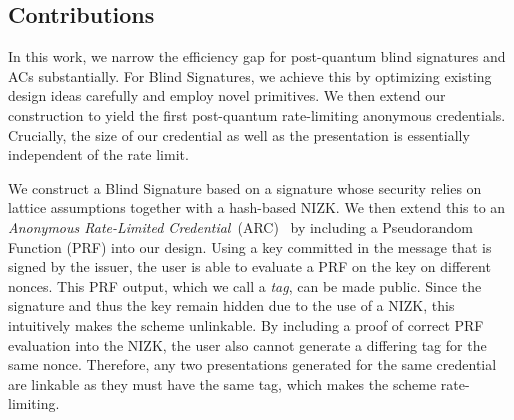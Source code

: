\subsection{Contributions}
In this work, we narrow the efficiency gap for post-quantum blind signatures and ACs substantially. For Blind Signatures, we achieve this by optimizing existing design ideas carefully and employ novel primitives. We then extend our construction to yield the first post-quantum rate-limiting anonymous credentials. Crucially, the size of our credential as well as the presentation is essentially independent of the rate limit.

We construct a Blind Signature based on a signature whose security relies on lattice assumptions together with a  hash-based NIZK. We then extend this to an \emph{Anonymous Rate-Limited Credential}~(ARC)~\cite{yun-privacypass-crypto-arc-00} by including a Pseudorandom Function (PRF) into our design. Using a key committed in the message that is signed by the issuer, the user is able to evaluate a PRF on the key on different nonces. This PRF output, which we call a \emph{tag}, can be made public. Since the signature and thus the key remain hidden due to the use of a NIZK,  this intuitively makes the scheme unlinkable. By including a proof of correct PRF evaluation into the NIZK, the user also cannot generate a differing tag for the same nonce. Therefore, any two presentations generated for the same credential are linkable as they must have the same tag, which makes the scheme rate-limiting.


